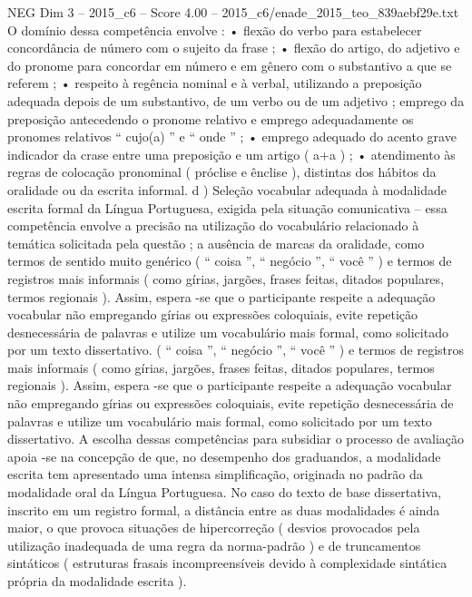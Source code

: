 \begin{textsample}{NEG Dim 3 – 2015\_c6 – Score 4.00 – 2015\_c6/enade\_2015\_teo\_839aebf29e.txt}
O domínio dessa competência envolve : • flexão do verbo para estabelecer concordância de número com o sujeito da frase ; • flexão do artigo, do adjetivo e do pronome para concordar em número e em gênero com o substantivo a que se referem ; • respeito à regência nominal e à verbal, utilizando a preposição adequada depois de um substantivo, de um verbo ou de um adjetivo ; emprego da preposição antecedendo o pronome relativo e emprego adequadamente os pronomes relativos “ cujo(a) ” e “ onde ” ; • emprego adequado do acento grave indicador da crase entre uma preposição e um artigo ( a+a ) ; • atendimento às regras de colocação pronominal ( próclise e ênclise ), distintas dos hábitos da oralidade ou da escrita informal. d ) Seleção vocabular adequada à modalidade escrita formal da Língua Portuguesa, exigida pela situação comunicativa – essa competência envolve a precisão na utilização do vocabulário relacionado à temática solicitada pela questão ; a ausência de marcas da oralidade, como termos de sentido muito genérico ( “ coisa ”, “ negócio ”, “ você ” ) e termos de registros mais informais ( como gírias, jargões, frases feitas, ditados populares, termos regionais ).
Assim, espera -se que o participante respeite a adequação vocabular não empregando gírias ou expressões coloquiais, evite repetição desnecessária de palavras e utilize um vocabulário mais formal, como solicitado por um texto dissertativo. ( “ coisa ”, “ negócio ”, “ você ” ) e termos de registros mais informais ( como gírias, jargões, frases feitas, ditados populares, termos regionais ).
Assim, espera -se que o participante respeite a adequação vocabular não empregando gírias ou expressões coloquiais, evite repetição desnecessária de palavras e utilize um vocabulário mais formal, como solicitado por um texto dissertativo.
A escolha dessas competências para subsidiar o processo de avaliação apoia -se na concepção de que, no desempenho dos graduandos, a modalidade escrita tem apresentado uma intensa simplificação, originada no padrão da modalidade oral da Língua Portuguesa.
No caso do texto de base dissertativa, inscrito em um registro formal, a distância entre as duas modalidades é ainda maior, o que provoca situações de hipercorreção ( desvios provocados pela utilização inadequada de uma regra da norma-padrão ) e de truncamentos sintáticos ( estruturas frasais incompreensíveis devido à complexidade sintática própria da modalidade escrita ).

\end{textsample}

